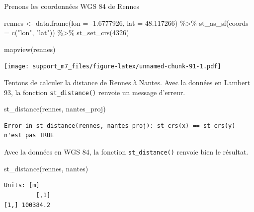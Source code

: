 \documentclass[
]{book}
\newenvironment{Shaded}{\begin{snugshade}}{\end{snugshade}}
\newcommand{\AttributeTok}[1]{\textcolor[rgb]{0.77,0.63,0.00}{#1}}
\newcommand{\DecValTok}[1]{\textcolor[rgb]{0.00,0.00,0.81}{#1}}
\newcommand{\FloatTok}[1]{\textcolor[rgb]{0.00,0.00,0.81}{#1}}
\newcommand{\FunctionTok}[1]{\textcolor[rgb]{0.00,0.00,0.00}{#1}}
\newcommand{\NormalTok}[1]{#1}
\newcommand{\OtherTok}[1]{\textcolor[rgb]{0.56,0.35,0.01}{#1}}
\newcommand{\SpecialCharTok}[1]{\textcolor[rgb]{0.00,0.00,0.00}{#1}}
\newcommand{\StringTok}[1]{\textcolor[rgb]{0.31,0.60,0.02}{#1}}
\begin{document}
Prenons les coordonnées WGS 84 de Rennes

\begin{Shaded}
\begin{Highlighting}[]
\NormalTok{rennes }\OtherTok{\textless{}{-}} \FunctionTok{data.frame}\NormalTok{(}\AttributeTok{lon =} \SpecialCharTok{{-}}\FloatTok{1.6777926}\NormalTok{, }\AttributeTok{lat =} \FloatTok{48.117266}\NormalTok{) }\SpecialCharTok{\%\textgreater{}\%}
  \FunctionTok{st\_as\_sf}\NormalTok{(}\AttributeTok{coords =} \FunctionTok{c}\NormalTok{(}\StringTok{"lon"}\NormalTok{, }\StringTok{"lat"}\NormalTok{)) }\SpecialCharTok{\%\textgreater{}\%}
  \FunctionTok{st\_set\_crs}\NormalTok{(}\DecValTok{4326}\NormalTok{)}
\end{Highlighting}
\end{Shaded}

\begin{Shaded}
\begin{Highlighting}[]
\FunctionTok{mapview}\NormalTok{(rennes)}
\end{Highlighting}
\end{Shaded}

\texttt{[image: support\_m7\_files/figure-latex/unnamed-chunk-91-1.pdf]}

Tentons de calculer la distance de Rennes à Nantes.
Avec la données en Lambert 93, la fonction \texttt{st\_distance()} renvoie un message d'erreur.

\begin{Shaded}
\begin{Highlighting}[]
\FunctionTok{st\_distance}\NormalTok{(rennes, nantes\_proj)}
\end{Highlighting}
\end{Shaded}

\begin{verbatim}
Error in st_distance(rennes, nantes_proj): st_crs(x) == st_crs(y) n'est pas TRUE
\end{verbatim}

Avec la données en WGS 84, la fonction \texttt{st\_distance()} renvoie bien le résultat.

\begin{Shaded}
\begin{Highlighting}[]
\FunctionTok{st\_distance}\NormalTok{(rennes, nantes)}
\end{Highlighting}
\end{Shaded}

\begin{verbatim}
Units: [m]
         [,1]
[1,] 100384.2
\end{verbatim}
\end{document}
